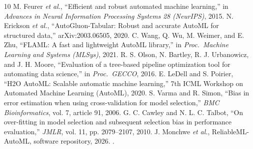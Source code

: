 \documentclass[conference]{IEEEtran}
\begin{document}
\begin{thebibliography}{10}
 M. Feurer \emph{et al.}, ``Efficient and robust automated machine learning,'' in \emph{Advances in Neural Information Processing Systems 28 (NeurIPS)}, 2015.
 N. Erickson \emph{et al.}, ``AutoGluon-Tabular: Robust and accurate AutoML for structured data,'' arXiv:2003.06505, 2020.
 C. Wang, Q. Wu, M. Weimer, and E. Zhu, ``FLAML: A fast and lightweight AutoML library,'' in \emph{Proc.\ Machine Learning and Systems (MLSys)}, 2021.
 R. S. Olson, N. Bartley, R. J. Urbanowicz, and J. H. Moore, ``Evaluation of a tree-based pipeline optimization tool for automating data science,'' in \emph{Proc.\ GECCO}, 2016.
 E. LeDell and S. Poirier, ``H2O AutoML: Scalable automatic machine learning,'' 7th ICML Workshop on Automated Machine Learning (AutoML), 2020.
 S. Varma and R. Simon, ``Bias in error estimation when using cross-validation for model selection,'' \emph{BMC Bioinformatics}, vol. 7, article 91, 2006.
 G. C. Cawley and N. L. C. Talbot, ``On over-fitting in model selection and subsequent selection bias in performance evaluation,'' \emph{JMLR}, vol. 11, pp. 2079--2107, 2010.
 J. Monchwe \emph{et al.}, ReliableML-AutoML, software repository, 2026. \projecturl.
\end{thebibliography}
\end{document}
